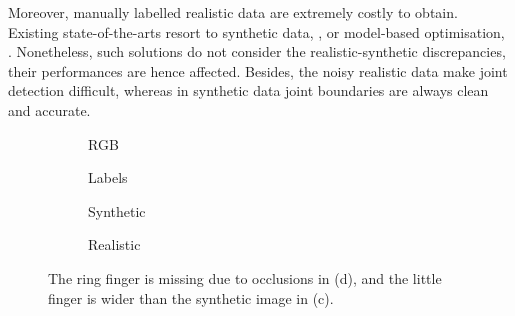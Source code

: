 Moreover, 
manually labelled realistic data are extremely costly to obtain. Existing state-of-the-arts resort to synthetic data, \eg \cite{Keskin_ECCV_12}, or model-based optimisation, \eg \cite{Gorce_PAMI_11, Oikonomidis_CVPR_12}. Nonetheless, such solutions do not consider the realistic-synthetic discrepancies, their performances are hence affected. Besides, the noisy realistic data make joint detection difficult, whereas in synthetic data joint boundaries are always clean and accurate.


\begin{figure}
\centering
\begin{subfigure}[b]{0.30\linewidth}
	\centering
	\caption{RGB}
\end{subfigure}
\begin{subfigure}[b]{0.22\linewidth}
	\centering
	\caption{Labels}
\end{subfigure}
\begin{subfigure}[b]{0.22\linewidth}
	\centering
	\caption{Synthetic}
\end{subfigure}
\begin{subfigure}[b]{0.22\linewidth}
	\centering
	\caption{Realistic}
\end{subfigure}
\caption{The ring finger is missing due to occlusions in (d), and the little finger is wider than the synthetic image in (c).}
\label{fig:intro}
\end{figure}

